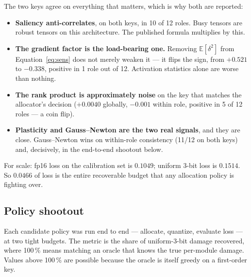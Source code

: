 \documentclass[11pt]{article}
\newcommand{\pct}{\,\%}
\begin{document}
The two keys agree on everything that matters, which is why both are reported:

\begin{itemize}
\item \textbf{Saliency anti-correlates}, on both keys, in 10 of 12 roles. Busy tensors are robust
tensors on this architecture. The published formula multiplies by this.
\item \textbf{The gradient factor is the load-bearing one.} Removing $\mathbb{E}[\delta^2]$ from
Equation~\ref{eq:sens} does not merely weaken it --- it flips the sign, from $+0.521$ to
$-0.338$, positive in 1 role out of 12. Activation statistics alone are worse than nothing.
\item \textbf{The rank product is approximately noise} on the key that matches the allocator's
decision ($+0.0040$ globally, $-0.001$ within role, positive in 5 of 12 roles --- a coin flip).
\item \textbf{Plasticity and Gauss--Newton are the two real signals}, and they are close.
Gauss--Newton wins on within-role consistency (11/12 on both keys) and, decisively, in the
end-to-end shootout below.
\end{itemize}

For scale: fp16 loss on the calibration set is $0.1049$; uniform 3-bit loss is $0.1514$. So
$0.0466$ of loss is the entire recoverable budget that any allocation policy is fighting over.

\subsection{Policy shootout}
\label{sec:shootout}

Each candidate policy was run end to end --- allocate, quantize, evaluate loss --- at two tight
budgets. The metric is the share of uniform-3-bit damage recovered, where 100\pct{} means
matching an oracle that knows the true per-module damage. Values above 100\pct{} are possible
because the oracle is itself greedy on a first-order key.
\end{document}

